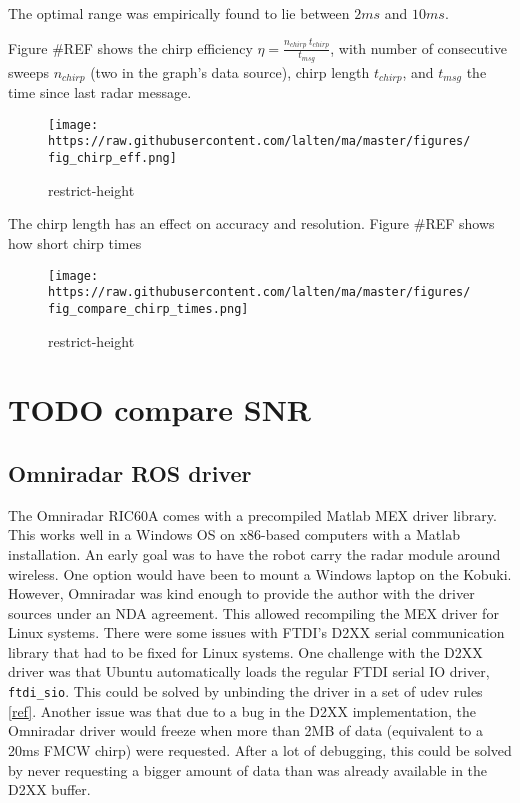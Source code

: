 The optimal range was empirically found to lie between \(2ms\) and
\(10ms\).

Figure \#REF shows the chirp efficiency
\(\eta = \frac{n_{chirp}~t_{chirp}}{t_{msg}}\), with number of
consecutive sweeps \(n_{chirp}\) (two in the graph's data source), chirp
length \(t_{chirp}\), and \(t_{msg}\) the time since last radar message.

\begin{figure}
\centering
\texttt{[image: https://raw.githubusercontent.com/lalten/ma/master/figures/fig\_chirp\_eff.png]}
\caption{restrict-height}
\end{figure}

The chirp length has an effect on accuracy and resolution. Figure \#REF
shows how short chirp times

\begin{figure}
\centering
\texttt{[image: https://raw.githubusercontent.com/lalten/ma/master/figures/fig\_compare\_chirp\_times.png]}
\caption{restrict-height}
\end{figure}

\section{TODO compare SNR}\label{todo-compare-snr}

\subsection{Omniradar ROS driver}\label{omniradar-ros-driver}

The Omniradar RIC60A comes with a precompiled Matlab MEX driver library.
This works well in a Windows OS on x86-based computers with a Matlab
installation. An early goal was to have the robot carry the radar module
around wireless. One option would have been to mount a Windows laptop on
the Kobuki. However, Omniradar was kind enough to provide the author
with the driver sources under an NDA agreement. This allowed recompiling
the MEX driver for Linux systems. There were some issues with FTDI's
D2XX serial communication library that had to be fixed for Linux
systems. One challenge with the D2XX driver was that Ubuntu
automatically loads the regular FTDI serial IO driver,
\texttt{ftdi\_sio}. This could be solved by unbinding the driver in a
set of udev rules
\href{https://stackoverflow.com/questions/44529376}{{[}ref{]}}. Another
issue was that due to a bug in the D2XX implementation, the Omniradar
driver would freeze when more than 2MB of data (equivalent to a 20ms
FMCW chirp) were requested. After a lot of debugging, this could be
solved by never requesting a bigger amount of data than was already
available in the D2XX buffer.

